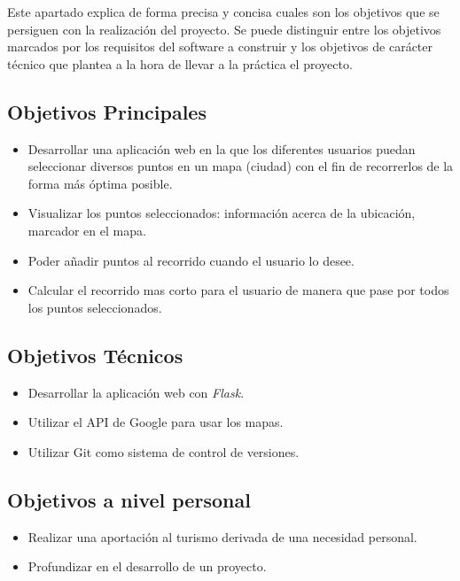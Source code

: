 
Este apartado explica de forma precisa y concisa cuales son los objetivos que se persiguen con la realización del proyecto. Se puede distinguir entre los objetivos marcados por los requisitos del software a construir y los objetivos de carácter técnico que plantea a la hora de llevar a la práctica el proyecto.

\subsection{Objetivos Principales}

\begin{itemize}
	\item Desarrollar una aplicación web en la que los diferentes usuarios puedan seleccionar diversos puntos en un mapa (ciudad) con el fin de recorrerlos de la forma más óptima posible.
	\item Visualizar los puntos seleccionados: información acerca de la ubicación, marcador en el mapa.
	\item Poder añadir puntos al recorrido cuando el usuario lo desee.
	\item Calcular el recorrido mas corto para el usuario de manera que pase por todos los puntos seleccionados.
\end{itemize}

\subsection{Objetivos Técnicos}
\begin{itemize}
	\item Desarrollar la aplicación web con \textit{Flask}.
	\item Utilizar el API de Google para usar los mapas.
	\item Utilizar Git como sistema de control de versiones.
\end{itemize}
\subsection{Objetivos a nivel personal}
\begin{itemize}
	\item Realizar una aportación al turismo derivada de una necesidad personal.
	\item Profundizar en el desarrollo de un proyecto.
\end{itemize}

